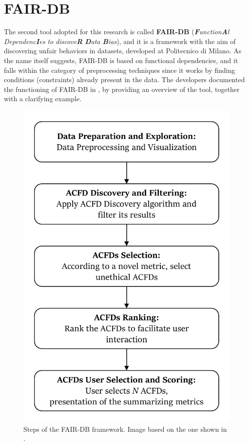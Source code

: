 \section{FAIR-DB}
\label{section:fair-db}
The second tool adopted for this research is called \textbf{FAIR-DB} (\textit{\textbf{F}unction\textbf{A}l Dependenc\textbf{I}es to discove\textbf{R} \textbf{D}ata \textbf{B}ias}), and it is a framework with the aim of discovering unfair behaviors in datasets, developed at Politecnico di Milano. As the name itself suggests, FAIR-DB is based on functional dependencies, and it falls within the category of preprocessing techniques since it works by finding conditions (constraints) already present in the data. The developers documented the functioning of FAIR-DB in \cite{azzalini2021fair}, by providing an overview of the tool, together with a clarifying example.

\begin{figure}[h!]
\includegraphics[scale=.7]{figures/fair-db_framework.pdf}
\centering
\caption{Steps of the FAIR-DB framework. Image based on the one shown in \cite{azzalini2021fair}.}
\label{fig:fair-db_framework}
\end{figure}

